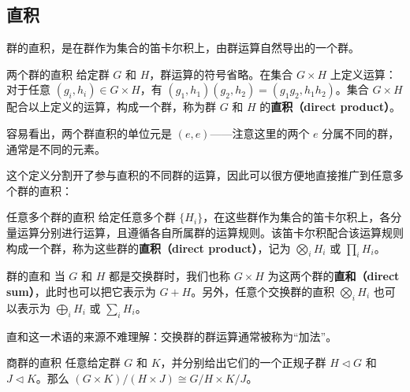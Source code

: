 


\subsection{直积}

群的直积，是在群作为集合的笛卡尔积上，由群运算自然导出的一个群。

\begin{definition}{两个群的直积}
给定群 $G$ 和 $H$，群运算的符号省略。在集合 $G\times H$ 上定义运算：对于任意 $(g_i, h_i)\in G\times H$，有 $(g_1, h_1)(g_2, h_2)=(g_1g_2, h_1h_2)$。集合 $G\times H$ 配合以上定义的运算，构成一个群，称为群 $G$ 和 $H$ 的\textbf{直积（direct product）}。
\end{definition}

容易看出，两个群直积的单位元是 $(e, e)$——注意这里的两个 $e$ 分属不同的群，通常是不同的元素。

这个定义分割开了参与直积的不同群的运算，因此可以很方便地直接推广到任意多个群的直积：

\begin{definition}{任意多个群的直积}
给定任意多个群 $\{H_i\}$，在这些群作为集合的笛卡尔积上，各分量运算分别进行运算，且遵循各自所属群的运算规则。该笛卡尔积配合该运算规则构成一个群，称为这些群的\textbf{直积（direct product）}，记为 $\bigotimes_iH_i$ 或 $\prod_iH_i$。
\end{definition}


\begin{definition}{群的直和}
当 $G$ 和 $H$ 都是交换群时，我们也称 $G\times H$ 为这两个群的\textbf{直和（direct sum）}，此时也可以把它表示为 $G+H$。另外，任意个交换群的直积 $\bigotimes_iH_i$ 也可以表示为 $\bigoplus_iH_i$ 或 $\sum_iH_i$。
\end{definition}

直和这一术语的来源不难理解：交换群的群运算通常被称为“加法”。

\begin{theorem}{商群的直积}\label{the_GrpPrd_1}
任意给定群 $G$ 和 $K$，并分别给出它们的一个正规子群 $H\triangleleft G$ 和 $J\triangleleft K$。那么 $(G\times K)/(H\times J)\cong G/H\times K/J$。
\end{theorem}

